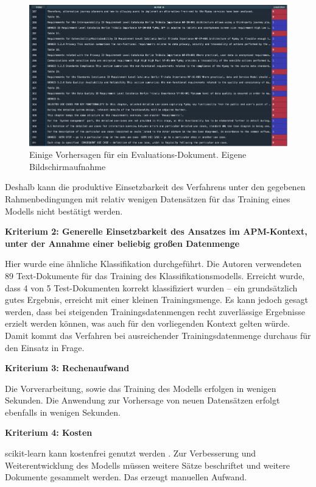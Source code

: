 \begin{figure}[h]
\centering
\includegraphics[scale=0.95]{content/pics/Picture_28.png}
\caption{Einige Vorhersagen für ein Evaluations-Dokument. Eigene Bildschirmaufnahme}
\label{Abbildung:lr-eval}
\end{figure}

Deshalb kann die produktive Einsetzbarkeit des Verfahrens unter den gegebenen Rahmenbedingungen mit relativ wenigen Datensätzen für das Training eines Modells nicht bestätigt werden.

{\bf Kriterium 2: Generelle Einsetzbarkeit des Ansatzes im APM-Kontext, unter der Annahme einer beliebig großen Datenmenge}

Hier \cite{Vogelsang} wurde eine ähnliche Klassifikation durchgeführt. Die Autoren verwendeten 89 Text-Dokumente für das Training des Klassifikationsmodells. Erreicht wurde, dass 4 von 5 Test-Dokumenten korrekt klassifiziert wurden – ein grundsätzlich gutes Ergebnis, erreicht mit einer kleinen Trainingsmenge. Es kann jedoch gesagt werden, dass bei steigenden Trainingsdatenmengen recht zuverlässige Ergebnisse erzielt werden können, was auch für den vorliegenden Kontext gelten würde. Damit kommt das Verfahren bei ausreichender Trainingsdatenmenge durchaus für den Einsatz in Frage. 

{\bf Kriterium 3: Rechenaufwand}

Die Vorverarbeitung, sowie das Training des Modells erfolgen in wenigen Sekunden. Die Anwendung zur Vorhersage von neuen Datensätzen erfolgt ebenfalls in wenigen Sekunden.

{\bf Kriterium 4: Kosten}

scikit-learn kann kostenfrei genutzt werden \cite{scikit-license}. Zur Verbesserung und Weiterentwicklung des Modells müssen weitere Sätze beschriftet und weitere Dokumente gesammelt werden. Das erzeugt manuellen Aufwand.

